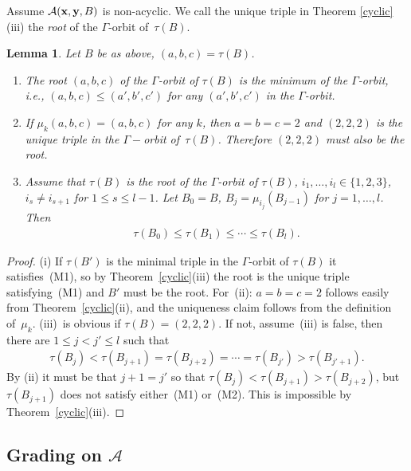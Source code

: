 \documentclass[pdftex]{sigma}
\numberwithin{equation}{section}
\newtheorem{Lemma}[Theorem]{Lemma}
\begin{document}
Assume $\mathcal{A}({\bf x},{\bf y},B)$ is non-acyclic. We call the unique triple in Theorem \ref{cyclic}(iii) the \emph{root} of the $\Gamma$-orbit of~$\tau(B)$.


\begin{Lemma}\label{lemma:chain inequality}
Let $B$ be as above, $(a,b,c)=\tau(B)$.
\begin{enumerate}\itemsep=0pt
\item[$(i)$] The root $(a,b,c)$ of the $\Gamma$-orbit of $\tau(B)$ is the minimum of the $\Gamma$-orbit, i.e., $(a,b,c)\le(a',b',c')$ for any $(a',b',c')$ in the $\Gamma$-orbit.

\item[$(ii)$] If $\mu_k(a,b,c)=(a,b,c)$ for any $k$, then $a=b=c=2$ and $(2,2,2)$ is the unique triple in the $\Gamma-$orbit of~$\tau(B)$. Therefore $(2,2,2)$ must also be the root.

\item[$(iii)$] Assume that $\tau(B)$ is the root of the $\Gamma$-orbit of $\tau(B)$,  $i_1,\dots,i_l\in\{1,2,3\}$, $i_s\neq i_{s+1}$ for $1\le s\le l-1$.
Let $B_0=B$, $B_j=\mu_{i_j}(B_{j-1})$ for $j=1,\dots,l$. Then
\begin{gather*}\tau(B_0)\le\tau(B_1)\le\cdots\le\tau(B_l).
\end{gather*}
\end{enumerate}
\end{Lemma}

\begin{proof}
(i) If $\tau(B')$ is the minimal triple in the $\Gamma$-orbit of $\tau(B)$ it satisf\/ies~(M1), so by Theo\-rem~\ref{cyclic}(iii) the root is the unique triple satisfying~(M1) and $B'$ must be the root.
For~(ii): $a=b=c=2$ follows easily from Theorem~\ref{cyclic}(ii), and the uniqueness claim follows from the def\/inition of~$\mu_k$.
 (iii)~is obvious if  $\tau(B)=(2,2,2)$. If not, assume~(iii) is false, then there are $1\le j<j'\le l$ such that
 \begin{gather*}
 \tau(B_j)<\tau(B_{j+1})=\tau(B_{j+2})=\cdots=\tau(B_{j'})>\tau(B_{j'+1}).
 \end{gather*}
By (ii) it must be that $j+1=j'$ so that  $\tau(B_j)< \tau(B_{j+1}) > \tau(B_{j+2})$, but $\tau(B_{j+1})$ does not satisfy either~(M1) or~(M2). This is impossible by Theorem~\ref{cyclic}(iii).
\end{proof}

\subsection[Grading on~$\mathcal{A}$]{Grading on $\boldsymbol{\mathcal{A}}$}\label{section4.2}
\end{document}
